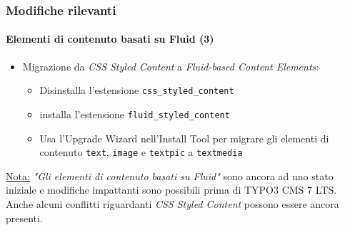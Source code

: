 \begin{frame}[fragile]
	\frametitle{Modifiche rilevanti}
	\framesubtitle{Elementi di contenuto basati su Fluid (3)}

	\begin{itemize}

		\item Migrazione da \textit{CSS Styled Content} a \textit{Fluid-based Content Elements}:

			\begin{itemize}

				\item Disinstalla l'estensione \texttt{css\_styled\_content}

				\item installa l'estensione \texttt{fluid\_styled\_content}

				\item Usa l'Upgrade Wizard nell'Install Tool per migrare gli elementi di contenuto
					\texttt{text}, \texttt{image} e \texttt{textpic} a \texttt{textmedia}

			\end{itemize}
	\end{itemize}

	\vspace{1.4cm}

	\begingroup
		\color{red}
			\small
				\underline{Nota:} \textit{"Gli elementi di contenuto basati su Fluid"} sono ancora ad uno stato iniziale
				e modifiche impattanti sono possibili prima di TYPO3 CMS 7 LTS.
				Anche alcuni conflitti riguardanti \textit{CSS Styled Content} possono essere ancora presenti.
			\normalsize
	\endgroup

\end{frame}



